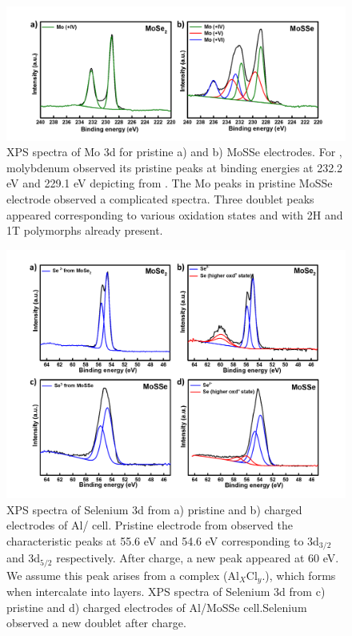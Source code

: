 \begin{figure}[htb!]
\centering
\includegraphics[width=\textwidth]{Figures/chap4fig/S3}
\caption{XPS spectra of Mo 3d for pristine a)  and b) MoSSe electrodes. For , molybdenum observed its pristine peaks at binding energies at 232.2 eV and 229.1 eV depicting  from . The Mo peaks in pristine MoSSe electrode observed a complicated spectra. Three doublet peaks appeared corresponding to various oxidation states  and  with 2H and 1T polymorphs already present. }
\label{Figures/chap4fig:S3}
\end{figure}

\begin{figure}[htb!]
\centering
\includegraphics[width=\textwidth]{Figures/chap4fig/S4}
\caption{XPS spectra of Selenium 3d from a) pristine and b) charged electrodes of Al/ cell. Pristine electrode from  observed the characteristic peaks at 55.6 eV and 54.6 eV corresponding to 3d$_{3/2}$ and 3d$_{5/2}$ respectively. After charge, a new peak appeared at 60 eV. We assume this peak arises from a complex (Al$_X$Cl$_y$.), which forms when  intercalate into  layers. XPS spectra of Selenium 3d from c) pristine and d) charged electrodes of Al/MoSSe cell.Selenium observed a new doublet after charge.}
\label{Figures/chap4fig:S4}
\end{figure}

